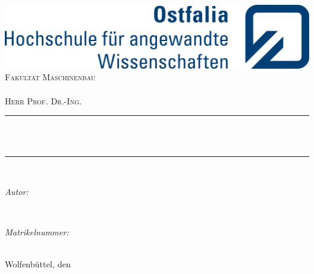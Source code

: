 \begin{titlepage} %
	\centering %
    
    \includegraphics[scale = 0.2]{images/Ostfalia.svg.png}\\[1.5 cm]	%
    \textsc{\LARGE Fakultät Maschinenbau}\\[2.0 cm]%
	\textsc{\Large \myStudyCourse}\\[0.5 cm]				%
	\textsc{\large Herr Prof. Dr.-Ing. \myProfessor}\\[0.5 cm] %
    	
	\rule{\linewidth}{0.2 mm} \\[0.4 cm] %
	{ \huge \bfseries \textcolor{DispositionColor}{\mytitle}}\\
	\rule{\linewidth}{0.2 mm} \\[0.4 cm] %
	
	\begin{minipage}{0.5\textwidth} %
		\begin{center} \large %
			\emph{Autor:}\\
			\myauthor
			\end{center}
			\end{minipage}~
			\begin{minipage}{0.5\textwidth}
			\begin{center} \large %
			\emph{Matrikelnummer:} \\
            \myMatNumber								
		\end{center}
	\end{minipage}\\[1.25 cm] %
	
	{ \large Wolfenbüttel, den \myDate} %
    
\end{titlepage}